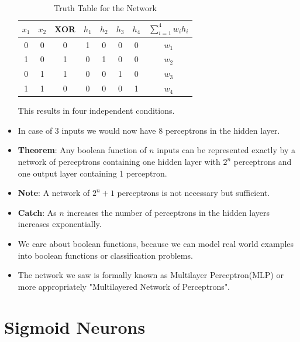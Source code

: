 \documentclass[a4paper]{article}
\begin{document}
\begin{itemize}
    \begin{table}[H]
        \centering
        \begin{tabular}{cccccccc}
            \hline
            $x_1$ & $x_2$ & XOR &  $h_1$ & $h_2$ & $h_3$ & $h_4$ & $\sum_{i=1}^4w_ih_i $\\
            \hline
            0 & 0 & 0 & 1 & 0 & 0 & 0 & $w_1$\\
            1 & 0 & 1 & 0 & 1 & 0 & 0 & $w_2$\\
            0 & 1 & 1 & 0 & 0 & 1 & 0 & $w_3$\\
            1 & 1 & 0 & 0 & 0 & 0 & 1 & $w_4$\\
            \hline
        \end{tabular}
        \caption{Truth Table for the Network}
        \label{tab:DL-network-truth}
    \end{table}
    This results in four independent conditions.
    \item In case of $3$ inputs we would now have $8$ perceptrons in the hidden layer.
    \item \textbf{Theorem}: Any boolean function of $n$ inputs can be represented exactly by a network of perceptrons containing one hidden layer with $2^n$ perceptrons and one output layer containing 1 perceptron.
    \item \textbf{Note}: A network of $2^n+1$ perceptrons is not necessary but sufficient.
    \item \textbf{Catch}: As $n$ increases the number of perceptrons in the hidden layers increases exponentially.
    \item We care about boolean functions, because we can model real world examples into boolean functions or classification problems.
    \item The network we saw is formally known as Multilayer Perceptron(MLP) or more appropriately "Multilayered Network of Perceptrons".
\end{itemize}

\section{Sigmoid Neurons}
\end{document}
